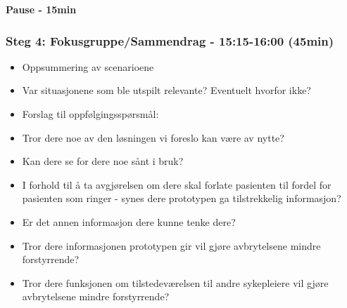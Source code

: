 \textbf{Pause - 15min}

\pagebreak

\subsubsection{Steg 4: Fokusgruppe/Sammendrag - 15:15-16:00 (45min)}

\begin{itemize}
\item Oppsummering av scenarioene
	\item Var situasjonene som ble utspilt relevante? Eventuelt hvorfor ikke?
\item Forslag til oppfølgingsspørsmål:
	\item Tror dere noe av den løsningen vi foreslo kan være av nytte?
	\item Kan dere se for dere noe sånt i bruk?
	\item I forhold til å ta avgjørelsen om dere skal forlate pasienten til fordel for pasienten som ringer - synes dere prototypen ga tilstrekkelig informasjon?
		\item Er det annen informasjon dere kunne tenke dere?
	\item Tror dere informasjonen prototypen gir vil gjøre avbrytelsene mindre forstyrrende?
	\item Tror dere funksjonen om tilstedeværelsen til andre sykepleiere vil gjøre avbrytelsene mindre forstyrrende?
\end{itemize}
